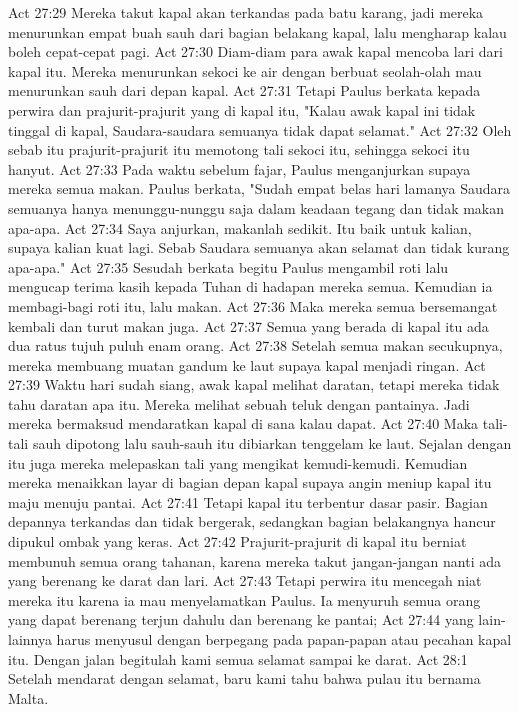Act 27:29  Mereka takut kapal akan terkandas pada batu karang, jadi mereka menurunkan empat buah sauh dari bagian belakang kapal, lalu mengharap kalau boleh cepat-cepat pagi.
Act 27:30  Diam-diam para awak kapal mencoba lari dari kapal itu. Mereka menurunkan sekoci ke air dengan berbuat seolah-olah mau menurunkan sauh dari depan kapal.
Act 27:31  Tetapi Paulus berkata kepada perwira dan prajurit-prajurit yang di kapal itu, "Kalau awak kapal ini tidak tinggal di kapal, Saudara-saudara semuanya tidak dapat selamat."
Act 27:32  Oleh sebab itu prajurit-prajurit itu memotong tali sekoci itu, sehingga sekoci itu hanyut.
Act 27:33  Pada waktu sebelum fajar, Paulus menganjurkan supaya mereka semua makan. Paulus berkata, "Sudah empat belas hari lamanya Saudara semuanya hanya menunggu-nunggu saja dalam keadaan tegang dan tidak makan apa-apa.
Act 27:34  Saya anjurkan, makanlah sedikit. Itu baik untuk kalian, supaya kalian kuat lagi. Sebab Saudara semuanya akan selamat dan tidak kurang apa-apa."
Act 27:35  Sesudah berkata begitu Paulus mengambil roti lalu mengucap terima kasih kepada Tuhan di hadapan mereka semua. Kemudian ia membagi-bagi roti itu, lalu makan.
Act 27:36  Maka mereka semua bersemangat kembali dan turut makan juga.
Act 27:37  Semua yang berada di kapal itu ada dua ratus tujuh puluh enam orang.
Act 27:38  Setelah semua makan secukupnya, mereka membuang muatan gandum ke laut supaya kapal menjadi ringan.
Act 27:39  Waktu hari sudah siang, awak kapal melihat daratan, tetapi mereka tidak tahu daratan apa itu. Mereka melihat sebuah teluk dengan pantainya. Jadi mereka bermaksud mendaratkan kapal di sana kalau dapat.
Act 27:40  Maka tali-tali sauh dipotong lalu sauh-sauh itu dibiarkan tenggelam ke laut. Sejalan dengan itu juga mereka melepaskan tali yang mengikat kemudi-kemudi. Kemudian mereka menaikkan layar di bagian depan kapal supaya angin meniup kapal itu maju menuju pantai.
Act 27:41  Tetapi kapal itu terbentur dasar pasir. Bagian depannya terkandas dan tidak bergerak, sedangkan bagian belakangnya hancur dipukul ombak yang keras.
Act 27:42  Prajurit-prajurit di kapal itu berniat membunuh semua orang tahanan, karena mereka takut jangan-jangan nanti ada yang berenang ke darat dan lari.
Act 27:43  Tetapi perwira itu mencegah niat mereka itu karena ia mau menyelamatkan Paulus. Ia menyuruh semua orang yang dapat berenang terjun dahulu dan berenang ke pantai;
Act 27:44  yang lain-lainnya harus menyusul dengan berpegang pada papan-papan atau pecahan kapal itu. Dengan jalan begitulah kami semua selamat sampai ke darat.
Act 28:1  Setelah mendarat dengan selamat, baru kami tahu bahwa pulau itu bernama Malta.
